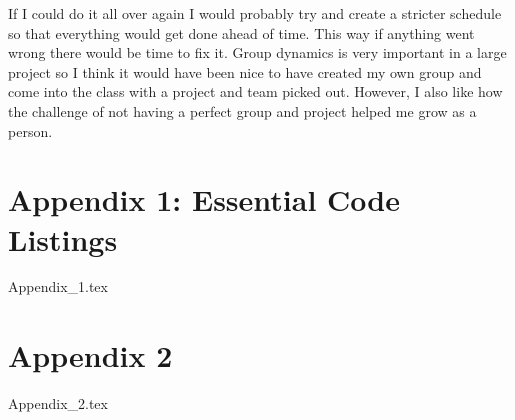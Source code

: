 \documentclass[onecolumn, draftclsnofoot,10pt, compsoc]{IEEEtran}
\begin{document}
If I could do it all over again I would probably try and create a stricter schedule so that everything would get done ahead of time. This way if anything went wrong there would be time to fix it. Group dynamics is very important in a large project so I think it would have been nice to have created my own group and come into the class with a project and team picked out. However, I also like how the challenge of not having a perfect group and project helped me grow as a person.
	
	\section{Appendix 1: Essential Code Listings}
		{Appendix_1.tex}
	\newpage
	\section{Appendix 2}
		{Appendix_2.tex}
	\newpage
	
	
	
	
	
\end{document}
